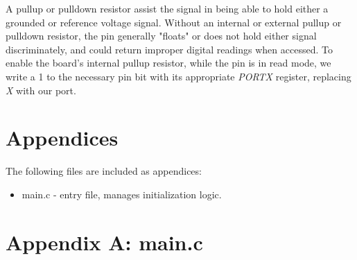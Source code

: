 \documentclass[letterpaper,11pt]{texMemo} %
\begin{document}
\begin{enumerate}
    A pullup or pulldown resistor assist the signal in being able to hold either a grounded or
reference voltage signal. Without an internal or external pullup or pulldown resistor, the pin
generally "floats" or does not hold either signal discriminately, and could return improper
digital readings when accessed. To enable the board's internal pullup resistor, while the pin
is in read mode, we write a 1 to the necessary pin bit with its appropriate \textit{PORTX} 
register, replacing \textit{X} with our port.

\end{enumerate}

\section*{Appendices}
The following files are included as appendices:
\begin{itemize}
\item main.c - entry file, manages initialization logic.
\end{itemize}
\newpage

\section*{Appendix A: main.c}
\begin{tiny}

\end{tiny}
\newpage
\end{document}
